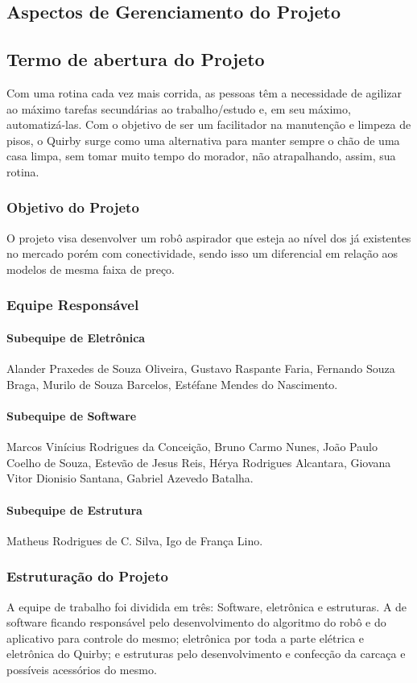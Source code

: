 \begin{apendicesenv}

\partapendices

\chapter{Aspectos de Gerenciamento do Projeto}
\section{Termo de abertura do Projeto}
Com uma rotina cada vez mais corrida, as pessoas têm a necessidade de agilizar ao máximo tarefas secundárias ao trabalho/estudo e, em seu máximo, automatizá-las. Com o objetivo de ser um facilitador na manutenção e limpeza de pisos, o Quirby surge como uma alternativa para manter sempre o chão de uma casa limpa, sem tomar muito tempo do morador, não atrapalhando, assim, sua rotina.
\subsection{Objetivo do Projeto}
O projeto visa desenvolver um robô aspirador que esteja ao nível dos já existentes no mercado porém com conectividade, sendo isso um diferencial em relação aos modelos de mesma faixa de preço.
\subsection{Equipe Responsável}
\subsubsection{Subequipe de Eletrônica}

Alander Praxedes de Souza Oliveira,
Gustavo Raspante Faria,
Fernando Souza Braga,
Murilo de Souza Barcelos,
Estéfane Mendes do Nascimento.
\subsubsection{Subequipe de Software}
Marcos Vinícius Rodrigues da Conceição,
Bruno Carmo Nunes,
João Paulo Coelho de Souza,
Estevão de Jesus Reis,
Hérya Rodrigues Alcantara,
Giovana Vitor Dionisio Santana,
Gabriel Azevedo Batalha.

\subsubsection{Subequipe de Estrutura}
Matheus Rodrigues de C. Silva,
Igo de França Lino.
\subsection{Estruturação do Projeto}
A equipe de trabalho foi dividida em três: Software, eletrônica e estruturas. A de software ficando responsável pelo desenvolvimento do algoritmo do robô e do aplicativo para controle do mesmo; eletrônica por toda a parte elétrica e eletrônica do Quirby; e estruturas pelo desenvolvimento e confecção da carcaça e possíveis acessórios do mesmo.

\end{apendicesenv}
